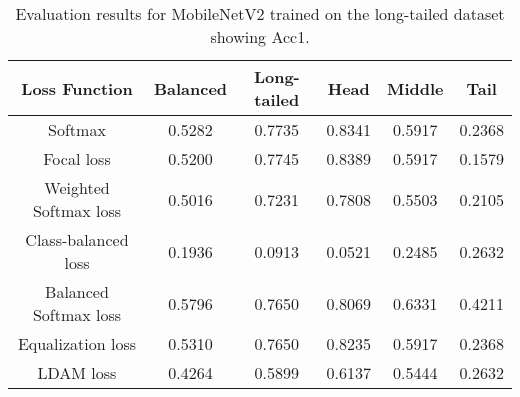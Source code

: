 \begin{table}[H]
    \centering
    \begin{tabular}{cccccc}
        \toprule
        Loss Function & Balanced & Long-tailed & Head & Middle & Tail \\ 
        \midrule
        Softmax   & 0.5282   & 0.7735 & 0.8341 & 0.5917 & 0.2368 \\
        Focal loss   & 0.5200   & 0.7745 & 0.8389 & 0.5917 & 0.1579 \\
        Weighted Softmax loss   & 0.5016   & 0.7231 & 0.7808 & 0.5503 & 0.2105 \\
        Class-balanced loss   & 0.1936   & 0.0913 & 0.0521 & 0.2485 & 0.2632 \\
        Balanced Softmax loss   & 0.5796   & 0.7650 & 0.8069 & 0.6331 & 0.4211 \\
        Equalization loss   & 0.5310   & 0.7650 & 0.8235 & 0.5917 & 0.2368 \\
        LDAM loss   & 0.4264 & 0.5899 & 0.6137 & 0.5444 & 0.2632 \\
        \bottomrule
    \end{tabular}
    \caption{Evaluation results for MobileNetV2 trained on the long-tailed dataset showing Acc1.}
    \label{tab:mobilenet_lt_acc1}
\end{table}

